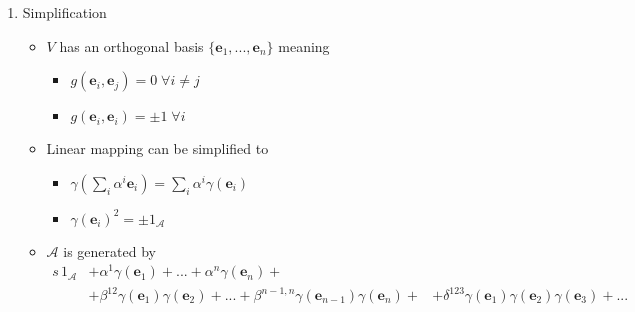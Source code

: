 \documentclass[../main.tex]{subfiles}
\begin{document}
\begin{itemize}
\begin{enumerate}
\begin{itemize}
\end{itemize}
\item Simplification 
\begin{itemize}
\item $V$ has an orthogonal basis $\{\mathbf{e}_1,...,\mathbf{e}_n\}$ meaning
\begin{itemize}
\item $g(\mathbf{e}_i,\mathbf{e}_j)=0\; \forall i\neq j$
\item $g(\mathbf{e}_i,\mathbf{e}_i)=\pm1\; \forall i$
\end{itemize}
\item Linear mapping can be simplified to
 \begin{itemize}
\item $\gamma(\sum_i\alpha^i\mathbf{e}_i)=\sum_i\alpha^i\gamma(\mathbf{e}_i)$
\item $\gamma(\mathbf{e}_i)^2=\pm1_\mathcal{A}$
\end{itemize}
\item $\mathcal{A}$ is generated by
\begin{align}
s\,1_\mathcal{A}
&+\alpha^1\gamma(\mathbf{e}_1)+...+\alpha^n\gamma(\mathbf{e}_n)+\\
&+\beta^{12}\gamma(\mathbf{e}_1)\gamma(\mathbf{e}_2)+...+\beta^{n-1,n}\gamma(\mathbf{e}_{n-1})\gamma(\mathbf{e}_n)+
&+\delta^{123}\gamma(\mathbf{e}_1)\gamma(\mathbf{e}_2)\gamma(\mathbf{e}_3)+...
\end{align}

\end{itemize}


\end{enumerate}
\end{itemize}
\end{document}
